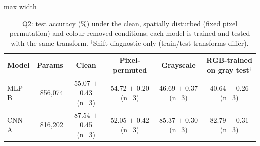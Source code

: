 \begin{table}[!tbp]\centering\footnotesize\setlength{\tabcolsep}{3pt}
\begin{adjustbox}{max width=\textwidth}
\begin{tabular}{lrcccc}\toprule
Model & Params & Clean & Pixel-permuted & Grayscale & RGB-trained on gray test$^\dagger$ \\\midrule
MLP-B & 856,074 & 55.07 $\pm$ 0.43 (n=3) & 54.72 $\pm$ 0.20 (n=3) & 46.69 $\pm$ 0.37 (n=3) & 40.64 $\pm$ 0.26 (n=3) \\
CNN-A & 816,202 & 87.54 $\pm$ 0.45 (n=3) & 52.05 $\pm$ 0.42 (n=3) & 85.37 $\pm$ 0.30 (n=3) & 82.79 $\pm$ 0.31 (n=3) \\
\bottomrule\end{tabular}
\end{adjustbox}
\caption{Q2: test accuracy (\%) under the clean, spatially disturbed (fixed pixel permutation) and colour-removed conditions; each model is trained and tested with the same transform. $^\dagger$Shift diagnostic only (train/test transforms differ).}\label{tab:q2}\end{table}
